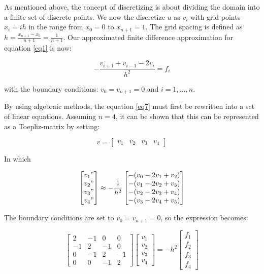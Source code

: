 \documentclass{article}
\begin{document}
As mentioned above,  the concept of discretizing is about dividing the domain into a finite set of discrete points. We now the discretize $u$ as $v_i$ with grid points $x_i =  ih$  in the range from $x_0= 0$ to $x_{n+1}=1$. The grid spacing is defined as $h = \frac{x_{n+1}-x_0}{n+1} = \frac{1}{n+1}$.  Our approximated finite difference approximation for equation \eqref{eq1} is now:

\begin{equation}\label{eq7}
-\frac{v_{i+1} + v_{i-1} -2v_i}{h^2} = f_i
\end{equation}

with the boundary conditions: $v_0 = v_{n+1} = 0$ and $i = 1,...,n$.  

\medskip


By using algebraic methods, the equation \eqref{eq7} must first be rewritten into a set of linear equations. Assuming $n= 4$, it can be shown that this can be represented as a Toepliz-matrix by setting: 

\[
	v
=
\begin{bmatrix}
	 v_1 & v_2 & v_3 & v_4
\end{bmatrix}
\]

In which 

\[
\begin{bmatrix}
	v_1" \\  v_2" \\ v_3" \\ v_4"
\end{bmatrix}
	\approx -\frac{1}{h^2}
\begin{bmatrix}
	-(v_{0} -2v_1 +v_2) \\
	-(v_1 -2v_2 +v_3) \\
	-(v_{2} -2v_3 +v_4) \\
	-(v_{3} -2v_4 +v_5) 
\end{bmatrix}
\]

The boundary conditions are set to $v_0 = v_{n+1} = 0$, so the expression becomes: 

\[
\begin{bmatrix}
	2 & -1 & 0 & 0 \\
	-1 & 2 & -1 & 0 \\
	0 & -1 & 2 & -1 \\
	0 & 0 & -1 & 2
\end{bmatrix}
\begin{bmatrix}
	v_1 \\  v_2 \\ v_3 \\ v_4
\end{bmatrix}
	= -h^2
\begin{bmatrix}
	f_1 \\
	f_2 \\
	f_3 \\
	f_4
\end{bmatrix}
\]
\end{document}

